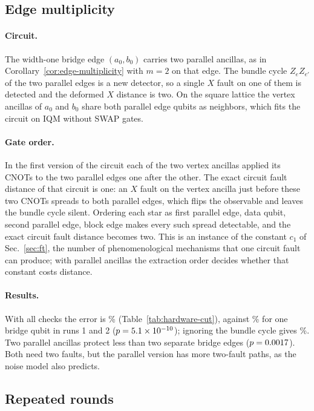 \documentclass[aps,prx,reprint,superscriptaddress,nofootinbib,floatfix,longbibliography]{revtex4-2}
\theoremstyle{definition}
\begin{document}
\subsection{Edge multiplicity}
\paragraph{Circuit.}
The width-one bridge edge $(a_0,b_0)$ carries two parallel ancillas, as in
Corollary~\ref{cor:edge-multiplicity} with $m=2$ on that edge.  The bundle
cycle $Z_eZ_{e'}$ of the two parallel edges is a new detector, so a single
$X$ fault on one of them is detected and the deformed $X$ distance is two.
On the square lattice the vertex ancillas of $a_0$ and $b_0$ share both
parallel edge qubits as neighbors, which fits the circuit on IQM without SWAP
gates.

\paragraph{Gate order.}
In the first version of the circuit each of the two vertex ancillas applied
its CNOTs to the two parallel edges one after the other.  The exact circuit
fault distance of that circuit is one: an $X$ fault on the vertex ancilla
just before these two CNOTs spreads to both parallel edges, which flips the
observable and leaves the bundle cycle silent.  Ordering each star as first
parallel edge, data qubit, second parallel edge, block edge makes every such
spread detectable, and the exact circuit fault distance becomes two.  This is
an instance of the constant $c_1$ of Sec.~\ref{sec:ft}, the number of
phenomenological mechanisms that one circuit fault can produce; with parallel
ancillas the extraction order decides whether that constant costs distance.

\paragraph{Results.}
With all checks the error is \hwMult\% (Table~\ref{tab:hardware-cut}),
against \hwIQMwOne\% for one bridge qubit in runs 1 and 2
($p=5.1\times10^{-10}$); ignoring the bundle cycle gives \hwMultCtrl\%.  Two parallel
ancillas protect less than two separate bridge edges ($p=0.0017$).
Both need two faults, but the parallel version has more two-fault paths, as
the noise model also predicts.

\subsection{Repeated rounds}
\end{document}
